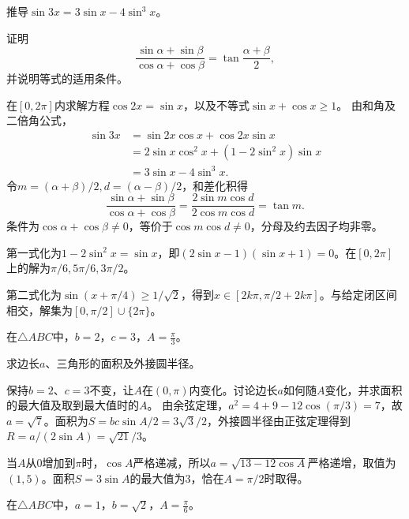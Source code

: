 \quad {}推导\(\sin 3 x = 3 \sin x - 4 \sin^{3} x\)。

\quad {}证明
\begin{equation*}
    \frac{\sin \alpha + \sin \beta}{\cos \alpha + \cos \beta}
    = \tan \frac{\alpha + \beta}{2} ,
\end{equation*}
并说明等式的适用条件。

\quad {}在\([0 , 2 \pi]\)内求解方程\(\cos 2 x = \sin x\)，以及不等式\(\sin x + \cos x \ge 1\)。
\solutionanswer
{}由和角及二倍角公式，
\[
\begin{aligned}
\sin3x&=\sin2x\cos x+\cos2x\sin x\\
&=2\sin x\cos^2x+(1-2\sin^2x)\sin x\\
&=3\sin x-4\sin^3x.
\end{aligned}
\]
令\(m=(\alpha+\beta)/2,d=(\alpha-\beta)/2\)，和差化积得
\[
\frac{\sin\alpha+\sin\beta}{\cos\alpha+\cos\beta}
=\frac{2\sin m\cos d}{2\cos m\cos d}=\tan m.
\]
条件为\(\cos\alpha+\cos\beta\ne0\)，等价于\(\cos m\cos d\ne0\)，分母及约去因子均非零。

第一式化为\(1-2\sin^2x=\sin x\)，即\((2\sin x-1)(\sin x+1)=0\)。在\([0,2\pi]\)上的解为\(\pi/6,5\pi/6,3\pi/2\)。

第二式化为\(\sin(x+\pi/4)\ge1/\sqrt2\)，得到\(x\in[2k\pi,\pi/2+2k\pi]\)。与给定闭区间相交，解集为\([0,\pi/2]\cup\{2\pi\}\)。


在\(\triangle A B C\)中，\(b = 2\)，\(c = 3\)，\(A = \frac{\pi}{3}\)。

\quad {}求边长\(a\)、三角形的面积及外接圆半径。

\quad {}保持\(b = 2\)、\(c = 3\)不变，让\(A\)在\((0 , \pi)\)内变化。讨论边长\(a\)如何随\(A\)变化，并求面积的最大值及取到最大值时的\(A\)。
\solutionanswer
{}由余弦定理，\(a^2=4+9-12\cos(\pi/3)=7\)，故\(a=\sqrt7\)。面积为\(S=bc\sin A/2=3\sqrt3/2\)，外接圆半径由正弦定理得到\(R=a/(2\sin A)=\sqrt{21}/3\)。

当\(A\)从\(0\)增加到\(\pi\)时，\(\cos A\)严格递减，所以\(a=\sqrt{13-12\cos A}\)严格递增，取值为\((1,5)\)。面积\(S=3\sin A\)的最大值为\(3\)，恰在\(A=\pi/2\)时取得。


在\(\triangle A B C\)中，\(a = 1\)，\(b = \sqrt{2}\)，\(A = \frac{\pi}{6}\)。

